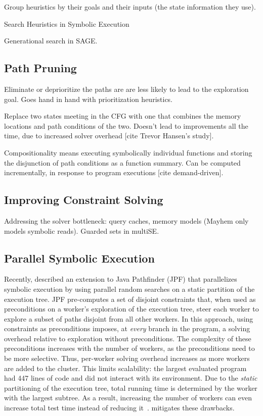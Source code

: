 Group heuristics by their goals and their inputs (the state information they use).

Search Heuristics in Symbolic Execution

Generational search in SAGE.

\subsection{Path Pruning}

Eliminate or deprioritize the paths are are less likely to lead to the exploration goal.  Goes hand in hand with prioritization heuristics.

Replace two states meeting in the CFG with one that combines the memory locations and path conditions of the two.  Doesn't lead to improvements all the time, due to increased solver overhead [cite Trevor Hansen's study].

Compositionality means executing symbolically individual functions and storing the disjunction of path conditions as a function summary.  Can be computed incrementally, in response to program executions [cite demand-driven].

\subsection{Improving Constraint Solving}

Addressing the solver bottleneck: query caches, memory models (Mayhem only models symbolic reads). Guarded sets in multiSE.

\subsection{Parallel Symbolic Execution}

Recently, \cite{parallelSymbex} described an extension to Java Pathfinder (JPF) that parallelizes symbolic execution by using parallel random searches on a static partition of the execution tree.  JPF pre-computes a set of disjoint constraints that, when used as preconditions on a worker's exploration of the execution tree, steer each worker to explore a subset of paths disjoint from all other workers.  In this approach, using constraints as preconditions imposes, at {\em every} branch in the program, a solving overhead relative to exploration without preconditions.  The complexity of these preconditions increases with the number of workers, as the preconditions need to be more selective.  Thus, per-worker solving overhead increases as more workers are added to the cluster.  This limits scalability: the largest evaluated program had 447 lines of code and did not interact with its environment.  Due to the {\em static} partitioning of the execution tree, total running time is determined by the worker with the largest subtree.  As a result, increasing the number of workers can even increase total test time instead of reducing it~\cite{parallelSymbex}.  \cnine mitigates these drawbacks.

